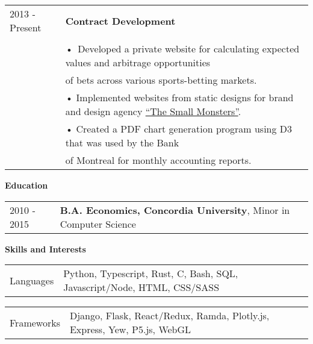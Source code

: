 \documentclass[10pt,notitlepage,oneside,draft]{article}
\begin{document}
\begin{flushleft}
  \begin{tabular}{p{78pt} | l}
    \scriptsize 2013 ‐ Present & \textbf{Contract Development} \\
    \\
    & • Developed a private website for calculating expected values and arbitrage opportunities \\
    & \hspace{5pt} of bets across various sports-betting markets. \\
    & • Implemented websites from static designs for brand and design agency \href{http://www.thesmallmonsters.com}{``The Small Monsters''}. \\
    & • Created a PDF chart generation program using D3 that was used by the Bank \\
    & \hspace{5pt} of Montreal for monthly accounting reports. \\
  \end{tabular}

  \vspace{12pt}

  \large
  \textbf{Education} \\
  \vspace{8pt}

  \normalsize
  \begin{tabular}{p{78pt} | l  }
    \scriptsize 2010 ‐ 2015 & \textbf{B.A. Economics, Concordia University}, Minor in Computer Science \\
  \end{tabular}

  \vspace{12pt}

  \large
  \textbf{Skills and Interests} \\
  \vspace{8pt}

  \normalsize
  \begin{tabular}{p{78pt} | l}
    \scriptsize Languages & Python, Typescript, Rust, C, Bash, SQL, Javascript/Node, HTML, CSS/SASS \\
  \end{tabular}

  \vspace{6pt}

  \begin{tabular}{p{78pt} | l}
    \scriptsize Frameworks & Django, Flask, React/Redux, Ramda, Plotly.js, Express, Yew, P5.js, WebGL \\
  \end{tabular}


\end{flushleft}
\end{document}
